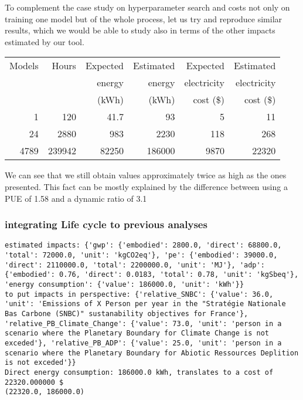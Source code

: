 \documentclass[11pt]{article}
\begin{document}
To complement the case study on hyperparameter search and costs not
only on training one model but of the whole process, let us try and
reproduce similar results, which we would be able to study also in
terms of the other impacts estimated by our tool.

\begin{center}
\begin{tabular}{rrrrrr}
Models & Hours & Expected & Estimated & Expected & Estimated\\
 &  & energy & energy & electricity & electricity\\
 &  & (kWh) & (kWh) & cost (\$) & cost (\$)\\
\hline
1 & 120 & 41.7 & 93 & 5 & 11\\
24 & 2880 & 983 & 2230 & 118 & 268\\
4789 & 239942 & 82250 & 186000 & 9870 & 22320\\
\end{tabular}
\end{center}

We can see that we still obtain values approximately twice as high as
the ones presented. This fact can be mostly explained by the
difference between using a PUE of 1.58 and a dynamic ratio of 3.1

\subsubsection{integrating Life cycle to previous analyses}
\label{sec:orgb341200}

\begin{verbatim}
estimated impacts: {'gwp': {'embodied': 2800.0, 'direct': 68800.0, 'total': 72000.0, 'unit': 'kgCO2eq'}, 'pe': {'embodied': 39000.0, 'direct': 2110000.0, 'total': 2200000.0, 'unit': 'MJ'}, 'adp': {'embodied': 0.76, 'direct': 0.0183, 'total': 0.78, 'unit': 'kgSbeq'}, 'energy consumption': {'value': 186000.0, 'unit': 'kWh'}}
to put impacts in perspective: {'relative_SNBC': {'value': 36.0, 'unit': 'Emissions of X Person per year in the "Stratégie Nationale Bas Carbone (SNBC)" sustanability objectives for France'}, 'relative_PB_Climate_Change': {'value': 73.0, 'unit': 'person in a scenario where the Planetary Boundary for Climate Change is not exceded'}, 'relative_PB_ADP': {'value': 25.0, 'unit': 'person in a scenario where the Planetary Boundary for Abiotic Ressources Deplition is not exceded'}}
Direct energy consumption: 186000.0 kWh, translates to a cost of 22320.000000 $
(22320.0, 186000.0)
\end{verbatim}
\end{document}
